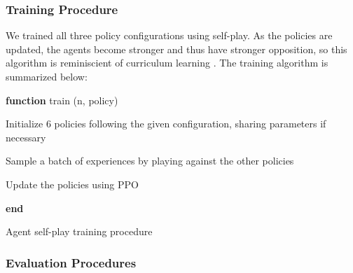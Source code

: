 \documentclass[12pt, a4paper, twocolumn]{article}
\begin{document}
\subsubsection{Training Procedure}


We trained all three policy configurations using self-play. As the policies are updated, the agents become stronger and thus have stronger opposition, so this algorithm is reminiscient of curriculum learning \cite{CurriculumLearning}. The training algorithm is summarized below:




\begin{algorithm}

  \textbf{function} train (n, policy)

  \Indp
  
  
  Initialize 6 policies following the given configuration, sharing parameters if necessary

   {
    Sample a batch of experiences by playing against the other policies

    Update the policies using PPO
  }

  \Indm
  \textbf{end}
  \caption{Agent self-play training procedure}
\end{algorithm}


\subsubsection{Evaluation Procedures}
\end{document}
